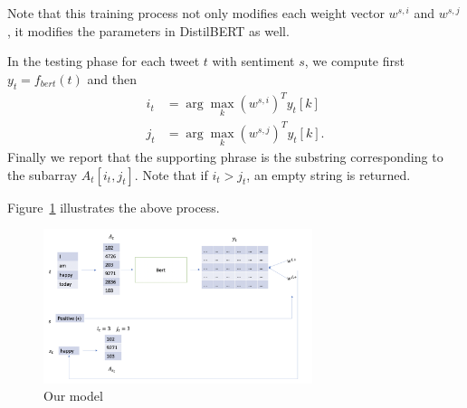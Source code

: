 Note that this training process not only modifies each weight vector $w^{s, i}$ and $w^{s, j}$, it modifies the parameters in DistilBERT as well.


In the testing phase for each tweet $t$ with sentiment $s$, we compute first $y_t = f_{bert}(t)$ and then 
\begin{align*}
	i_{t} &= \arg\max_{k} (w^{s, i})^T y_t[k] \\
	j_{t} &= \arg\max_{k} (w^{s, j})^T y_t[k].
\end{align*}
Finally we report that the supporting phrase is the substring corresponding to the subarray $A_t[i_{t}, j_{t}]$. Note that if $i_{t} > j_{t}$, an empty string is returned.

 Figure~\ref{fig:model} illustrates the above process.

\begin{figure}[!h]
	\centering
	\includegraphics[width=0.7\textwidth,keepaspectratio]{model}
	\caption{Our model}
	\label{fig:model}
\end{figure}
